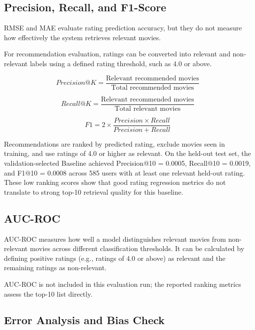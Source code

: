 \documentclass[11pt,a4paper]{article}
\begin{document}
\subsection{Precision, Recall, and F1-Score}

RMSE and MAE evaluate rating prediction accuracy, but they
do not measure how effectively the system retrieves relevant
movies.

For recommendation evaluation, ratings can be converted into
relevant and non-relevant labels using a defined rating
threshold, such as 4.0 or above.

\begin{equation}
Precision@K =
\frac{\text{Relevant recommended movies}}
{\text{Total recommended movies}}
\end{equation}

\begin{equation}
Recall@K =
\frac{\text{Relevant recommended movies}}
{\text{Total relevant movies}}
\end{equation}

\begin{equation}
F1 = 2 \times
\frac{Precision \times Recall}{Precision + Recall}
\end{equation}

Recommendations are ranked by predicted rating, exclude movies
seen in training, and use ratings of 4.0 or higher as relevant.
On the held-out test set, the validation-selected Baseline
achieved Precision@10 = 0.0005, Recall@10 = 0.0019, and
F1@10 = 0.0008 across 585 users with at least one relevant
held-out rating. These low ranking scores show that good rating
regression metrics do not translate to strong top-10 retrieval
quality for this baseline.

\subsection{AUC-ROC}

AUC-ROC measures how well a model distinguishes relevant
movies from non-relevant movies across different classification
thresholds. It can be calculated by defining positive ratings
(e.g., ratings of 4.0 or above) as relevant and the remaining
ratings as non-relevant.

AUC-ROC is not included in this evaluation run; the reported
ranking metrics assess the top-10 list directly.

\subsection{Error Analysis and Bias Check}
\end{document}
